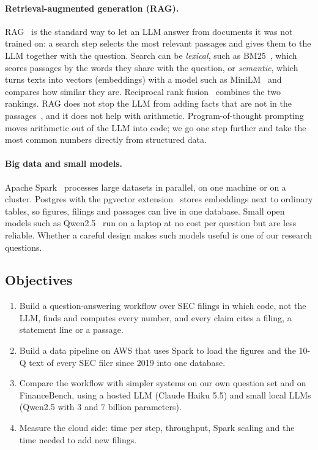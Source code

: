 \paragraph{Retrieval-augmented generation (RAG).} RAG~\cite{rag} is the standard way to let an LLM
answer from documents it was not trained on: a search step selects the most relevant passages and
gives them to the LLM together with the question. Search can be \emph{lexical}, such as
BM25~\cite{bm25}, which scores passages by the words they share with the question, or
\emph{semantic}, which turns texts into vectors (embeddings) with a model such as
MiniLM~\cite{minilm,sbert} and compares how similar they are. Reciprocal rank fusion~\cite{rrf}
combines the two rankings. RAG does not stop the LLM from adding facts that are not in the
passages~\cite{hallucination}, and it does not help with arithmetic. Program-of-thought
prompting~\cite{pot} moves arithmetic out of the LLM into code; we go one step further and take the
most common numbers directly from structured data.

\paragraph{Big data and small models.} Apache Spark~\cite{spark} processes large datasets in
parallel, on one machine or on a cluster. Postgres with the pgvector extension~\cite{pgvector} stores
embeddings next to ordinary tables, so figures, filings and passages can live in one database. Small
open models such as Qwen2.5~\cite{qwen25} run on a laptop at no cost per question but are less
reliable. Whether a careful design makes such models useful is one of our research questions.

\subsection{Objectives}

\begin{enumerate}
  \item Build a question-answering workflow over SEC filings in which code, not the LLM, finds and
        computes every number, and every claim cites a filing, a statement line or a passage.
  \item Build a data pipeline on AWS that uses Spark to load the figures and the 10-Q text of every
        SEC filer since 2019 into one database.
  \item Compare the workflow with simpler systems on our own question set and on FinanceBench, using
        a hosted LLM (Claude Haiku 5.5) and small local LLMs (Qwen2.5 with 3 and 7 billion
        parameters).
  \item Measure the cloud side: time per step, throughput, Spark scaling and the time needed to add
        new filings.
\end{enumerate}
